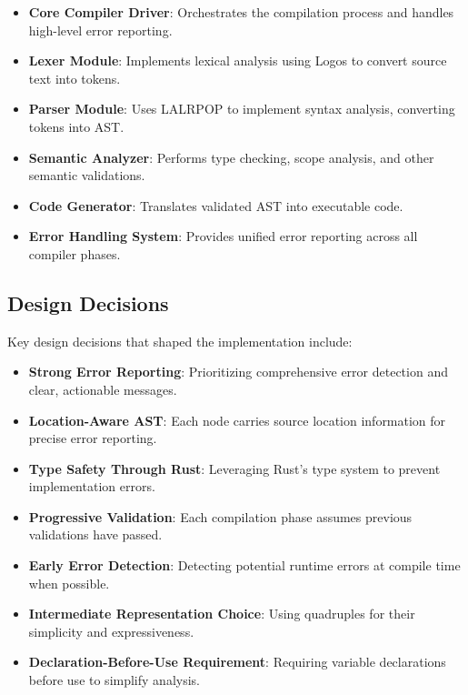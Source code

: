 \documentclass[12pt,a4paper]{article}
\begin{document}
\begin{itemize}
	\item \textbf{Core Compiler Driver}: Orchestrates the compilation process and handles high-level error reporting.

	\item \textbf{Lexer Module}: Implements lexical analysis using Logos to convert source text into tokens.

	\item \textbf{Parser Module}: Uses LALRPOP to implement syntax analysis, converting tokens into AST.

	\item \textbf{Semantic Analyzer}: Performs type checking, scope analysis, and other semantic validations.

	\item \textbf{Code Generator}: Translates validated AST into executable code.

	\item \textbf{Error Handling System}: Provides unified error reporting across all compiler phases.
\end{itemize}

\subsection{Design Decisions}
Key design decisions that shaped the implementation include:

\begin{itemize}
	\item \textbf{Strong Error Reporting}: Prioritizing comprehensive error detection and clear, actionable messages.

	\item \textbf{Location-Aware AST}: Each node carries source location information for precise error reporting.

	\item \textbf{Type Safety Through Rust}: Leveraging Rust's type system to prevent implementation errors.

	\item \textbf{Progressive Validation}: Each compilation phase assumes previous validations have passed.

	\item \textbf{Early Error Detection}: Detecting potential runtime errors at compile time when possible.

	\item \textbf{Intermediate Representation Choice}: Using quadruples for their simplicity and expressiveness.

	\item \textbf{Declaration-Before-Use Requirement}: Requiring variable declarations before use to simplify analysis.
\end{itemize}
\end{document}

